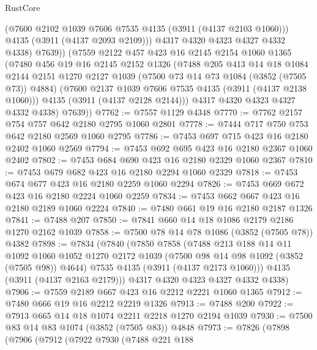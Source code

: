 \begin{lexlean}{RustCore}
\begin{coremodule}
              (@7600 @2102 @1039 @7606 @7535 @4135 (@3911 (@4137 @2103 @1060)))
              @4135
              (@3911 (@4137 @2093 @2109)))
            @4317
            @4320
            @4323
            @4327
            @4332
            @4338)
          @7639))
      (@7559
        @2122
        @457
        @423
        @16
        @2145
        @2154
        @1060
        @1365
        (@7480
          @456
          @19
          @16
          @2145
          @2152
          @1326
          (@7488
            @205
            @413
            @14
            @18
            @1084
            @2144
            @2151
            @1270
            @2127
            @1039
            (@7500 @73 @14 @73 @1084 (@3852 (@7505 @73)) @4884)
            (@7600 @2137 @1039 @7606 @7535 @4135 (@3911 (@4137 @2138 @1060)))
            @4135
            (@3911 (@4137 @2128 @2144)))
          @4317
          @4320
          @4323
          @4327
          @4332
          @4338)
        @7639))
@7762 := @7557 @1129 @4348
@7770 := @7762 @2157 @754 @757 @642 @2180 @2795 @1060 @2801
@7778 := @7444 @717 @750 @753 @642 @2180 @2569 @1060 @2795
@7786 := @7453 @697 @715 @423 @16 @2180 @2402 @1060 @2569
@7794 := @7453 @692 @695 @423 @16 @2180 @2367 @1060 @2402
@7802 := @7453 @684 @690 @423 @16 @2180 @2329 @1060 @2367
@7810 := @7453 @679 @682 @423 @16 @2180 @2294 @1060 @2329
@7818 := @7453 @674 @677 @423 @16 @2180 @2259 @1060 @2294
@7826 := @7453 @669 @672 @423 @16 @2180 @2224 @1060 @2259
@7834 := @7453 @662 @667 @423 @16 @2180 @2189 @1060 @2224
@7840 := @7480 @661 @19 @16 @2180 @2187 @1326
@7841 := @7488 @207
@7850 := @7841 @660 @14 @18 @1086 @2179 @2186 @1270 @2162 @1039
@7858 := @7500 @78 @14 @78 @1086 (@3852 (@7505 @78)) @4382
@7898 := @7834
    (@7840
      (@7850
        @7858
        (@7488
          @213
          @188
          @14
          @11
          @1092
          @1060
          @1052
          @1270
          @2172
          @1039
          (@7500 @98 @14 @98 @1092 (@3852 (@7505 @98)) @4644)
          @7535
          @4135
          (@3911 (@4137 @2173 @1060)))
        @4135
        (@3911 (@4137 @2163 @2179)))
      @4317
      @4320
      @4323
      @4327
      @4332
      @4338)
@7906 := @7559 @2189 @667 @423 @16 @2212 @2221 @1060 @1365
@7912 := @7480 @666 @19 @16 @2212 @2219 @1326
@7913 := @7488 @200
@7922 := @7913 @665 @14 @18 @1074 @2211 @2218 @1270 @2194 @1039
@7930 := @7500 @83 @14 @83 @1074 (@3852 (@7505 @83)) @4848
@7973 := @7826
    (@7898
      (@7906
        (@7912
          (@7922
            @7930
            (@7488
              @221
              @188

\end{coremodule}
\end{lexlean}
